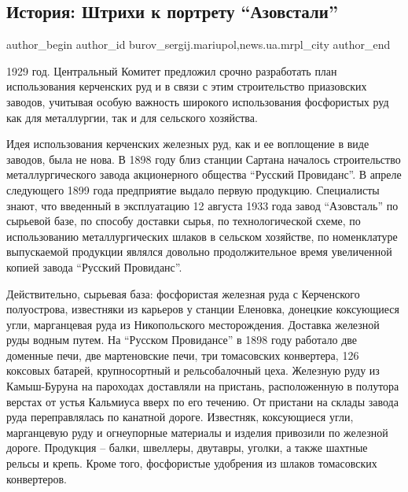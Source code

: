  
 
 
 
 
 
\subsection{История: Штрихи к портрету \enquote{Азовстали}}
\label{sec:11_08_2017.stz.news.ua.mrpl_city.1.istoria_shtihi_k_portretu_azovstali}
 
\ifcmt
 author_begin
   author_id burov_sergij.mariupol,news.ua.mrpl_city
 author_end
\fi

1929 год. Центральный Комитет предложил срочно разработать план использования
керченских руд и в связи с этим строительство приазовских заводов, учитывая
особую важность широкого исполь­зования фосфористых руд как для металлургии,
так и для сельского хозяйства.

Идея использования керченских железных руд, как и ее воплощение в виде заводов,
была не нова.  В 1898 году близ станции Сартана началось строительство
металлургического завода акционерного общества  \enquote{Русский Провиданс}. В апреле
следующего 1899 года предприятие выдало первую продукцию. Специалисты знают,
что введенный в эксплуатацию 12 августа 1933 года завод \enquote{Азовсталь}  по
сырьевой базе, по способу доставки сырья, по технологической схеме, по
использованию металлургических шлаков в сельском хозяйстве, по номенклатуре
выпускаемой  продукции  являлся  довольно продолжительное время увеличенной
копией завода \enquote{Русский Провиданс}.

Действительно, сырьевая база: фосфористая железная руда с Керченского
полуострова, известняки из карьеров у станции Еленовка, донецкие коксующиеся
угли, марганцевая руда из Никопольского месторождения. Доставка железной руды
водным путем. На \enquote{Русском Провидансе} в 1898 году работало две доменные печи,
две мартеновские печи, три томасовских конвертера, 126 коксовых батарей,
крупносортный и рельсобалочный цеха. Железную руду из Камыш-Буруна  на
пароходах доставляли на пристань, расположенную в полутора верстах от устья
Кальмиуса вверх по его течению. От пристани на склады завода руда
переправлялась по канатной дороге. Известняк, коксующиеся угли, марганцевую
руду и огнеупорные материалы и изделия привозили по железной дороге. Продукция
–  балки, швеллеры, двутавры, уголки, а также шахтные рельсы и крепь. Кроме
того, фосфористые удобрения из шлаков томасовских конвертеров.


